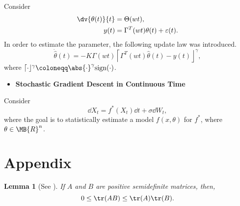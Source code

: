 \documentclass{my-handout}
\newtheorem{lemma}{Lemma}
\begin{document}
Consider \[
\begin{aligned}
    \dv{\theta(t)}{t} &= \Theta(wt), \\
    y(t) &= \Gamma^T(wt) \theta(t) + \varepsilon(t).
\end{aligned}
\] In order to estimate the parameter, the following update law was
introduced. \[
\dot{\hat{\theta}}(t) = - K \Gamma(wt) \left\lceil \Gamma^T(wt) \hat{\theta}(t)
- y(t) \right\rfloor^\gamma,
\] where
\(\lceil \cdot \rfloor^\gamma \coloneqq \abs{\cdot}^\gamma \mathrm{sign}(\cdot)\).

\begin{itemize}
\item
	\textbf{Stochastic Gradient Descent in Continuous
	Time}\cite{sirignano_stochastic_2017}
\end{itemize}

Consider \[
\dd{X_t} = f^\ast (X_t) \dd{t} + \sigma \dd{W_t},
\] where the goal is to statistically estimate a model \(f(x, \theta)\)
for \(f^\ast\), where \(\theta \in \MB{R}^n\).


\section{Appendix}

\begin{lemma}[See \cite{ulukok_matrix_2010}]
	If $A$ and $B$ are positive semidefinite matrices, then,
	\[ 0 \le \tr(AB) \le \tr(A) \tr(B). \] 
\end{lemma}



\end{document}
